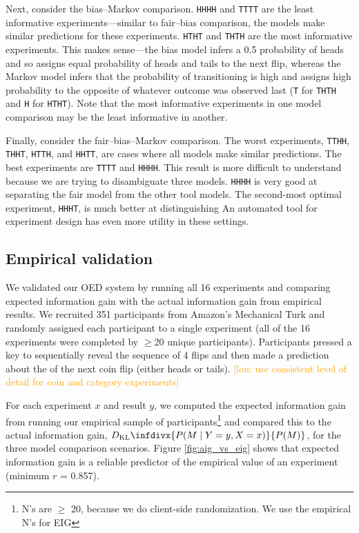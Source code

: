 \documentclass{article}
\newcommand{\dkl}{D_\mathrm{KL}\infdivx}
\newcommand{\lou}[1]{\textcolor{orange}{[lou: #1]}}
\begin{document}
Next, consider the bias--Markov comparison.
\lstinline{HHHH} and \lstinline{TTTT} are the least informative experiments---similar to fair--bias comparison, the models make similar predictions for these experiments.
\lstinline{HTHT} and \lstinline{THTH} are the most informative experiments.
This makes sense---the bias model infers a 0.5 probability of heads and so assigns equal probability of heads and tails to the next flip, whereas the Markov model infers that the probability of transitioning is high and assigns high probability to the opposite of whatever outcome was observed last (\lstinline{T} for \lstinline{THTH} and \lstinline{H} for \lstinline{HTHT}).
Note that the most informative experiments in one model comparison may be the least informative in another.

Finally, consider the fair--bias--Markov comparison.
The worst experiments, \lstinline{TTHH}, \lstinline{THHT}, \lstinline{HTTH}, and \lstinline{HHTT}, are cases where all models make similar predictions.
The best experiments are \lstinline{TTTT} and \lstinline{HHHH}.
This result is more difficult to understand because we are trying to disambiguate three models.
\lstinline{HHHH} is very good at separating the fair model from the other tool models.
The second-most optimal experiment, \lstinline{HHHT}, is much better at distinguishing
An automated tool for experiment design has even more utility in these settings.



\subsection{Empirical validation}
We validated our OED system by running all 16 experiments and comparing expected information gain with the actual information gain from empirical results.
We recruited 351 participants from Amazon's Mechanical Turk and randomly assigned each participant to a single experiment (all of the 16 experiments were completed by $\geq$20 unique participants).
Participants pressed a key to sequentially reveal the sequence of 4 flips and then made a prediction about the of the next coin flip (either heads or tails).
\lou{use consistent level of detail for coin and category experiments}

For each experiment $x$ and result $y$, we computed the expected information gain from running our empirical sample of participants\footnote{N's are $\geq$ 20, because we do client-side randomization. We use the empirical N's for EIG} and compared this to the actual information gain, $\dkl{P(M \mid Y = y, X = x)}{P(M)}$, for the three model comparison scenarios.
Figure \ref{fig:aig_vs_eig} shows that expected information gain is a reliable predictor of the empirical value of an experiment (minimum $r$ = 0.857).
\end{document}

